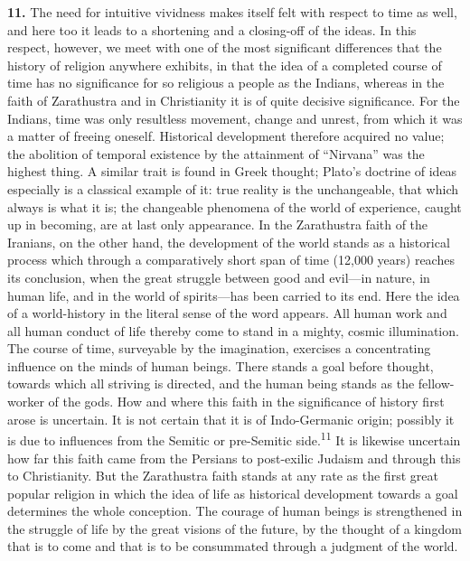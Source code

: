 \documentclass[12pt,a4paper]{book}
\newcommand{\opage}[1]{\marginnote{\footnotesize\textit{[#1]}}}
\begin{document}
\noindent\textbf{11.} The need for intuitive vividness makes itself felt
with respect to time as well, and here too it leads to a shortening and a
closing-off of the ideas. In this respect, however, we meet with one of the
most significant differences that the history of religion anywhere exhibits,
in that the idea of a completed course of time has 
\opage{31}no significance for so
religious a people as the Indians, whereas in the faith of Zarathustra and in
Christianity it is of quite decisive significance. For the Indians, time was
only resultless movement, change and unrest, from which it was a matter of
freeing oneself. Historical development therefore acquired no value; the
abolition of temporal existence by the attainment of ``Nirvana'' was the
highest thing. A similar trait is found in Greek thought; Plato's doctrine of
ideas especially is a classical example of it: true reality is the
unchangeable, that which always is what it is; the changeable phenomena of
the world of experience, caught up in becoming, are at last only appearance.
In the Zarathustra faith of the Iranians, on the other hand, the development
of the world stands as a historical process which through a comparatively
short span of time (12,000 years) reaches its conclusion, when the great
struggle between good and evil---in nature, in human life, and in the world
of spirits---has been carried to its end. Here the idea of a world-history in
the literal sense of the word appears. All human work and all human conduct
of life thereby come to stand in a mighty, cosmic illumination. The course of
time, surveyable by the imagination, exercises a concentrating influence on
the minds of human beings. There stands a goal before thought, towards which
all striving is directed, and the human being stands as the fellow-worker of
the gods. How and where this faith in the significance of history first arose
is uncertain. It is not certain that it is of Indo-Germanic origin; possibly
it is due to influences from the Semitic or pre-Semitic
side.\textsuperscript{11} It is likewise uncertain how far this faith came
from the Persians to post-exilic Judaism and through this to Christianity.
But the Zarathustra faith stands at any rate as the first great popular
religion in which the idea of life as historical development towards a goal
determines the whole conception. The courage of human beings is strengthened
in the struggle of life by the great visions of the future, by the thought of
a kingdom that is to come and that is to be consummated through a judgment of
the world.
\end{document}
